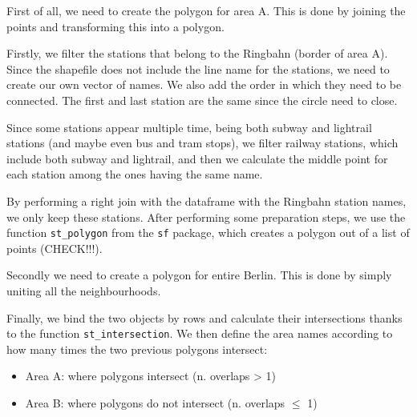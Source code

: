 First of all, we need to create the polygon for area A. This is done by joining the points and transforming this into a polygon.

Firstly, we filter the stations that belong to the Ringbahn (border of area A). Since the shapefile does not include the line name for the stations, we need to create our own vector of names. We also add the order in which they need to be connected. The first and last station are the same since the circle need to close.



Since some stations appear multiple time, being both subway and lightrail stations (and maybe even bus and tram stops), we filter railway stations, which include both subway and lightrail, and then we calculate the middle point for each station among the ones having the same name.



By performing a right join with the dataframe with the Ringbahn station names, we only keep these stations. After performing some preparation steps, we use the function \texttt{st\_polygon} from the \texttt{sf} package, which creates a polygon out of a list of points (CHECK!!!).



Secondly we need to create a polygon for entire Berlin. This is done by simply uniting all the neighbourhoods.



Finally, we bind the two objects by rows and calculate their intersections thanks to the function \texttt{st\_intersection}. We then define the area names according to how many times the two previous polygons intersect:
	\begin{itemize}
    		\item Area A: where polygons intersect (n. overlaps > 1)
    		\item Area B: where polygons do not intersect (n. overlaps $\leq$ 1)
    \end{itemize}

